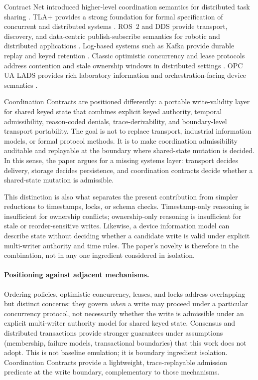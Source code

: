 \documentclass[11pt]{article}
\begin{document}
Contract Net introduced higher-level coordination semantics for distributed task sharing \cite{smith1980contract}. TLA$+$ provides a strong foundation for formal specification of concurrent and distributed systems \cite{lamport2002specifying}. ROS~2 and DDS provide transport, discovery, and data-centric publish-subscribe semantics for robotic and distributed applications \cite{ros2dds,ros2qos,ros2security}. Log-based systems such as Kafka provide durable replay and keyed retention \cite{kafkaIntro,kafkaCompact}. Classic optimistic concurrency and lease protocols address contention and stale ownership windows in distributed settings \cite{kung1981occ,gray1989leases}. OPC UA LADS provides rich laboratory information and orchestration-facing device semantics \cite{ladsScope,ladsIntro}.

Coordination Contracts are positioned differently: a portable write-validity layer for shared keyed state that combines explicit keyed authority, temporal admissibility, reason-coded denials, trace-derivability, and boundary-level transport portability. The goal is not to replace transport, industrial information models, or formal protocol methods. It is to make coordination admissibility auditable and replayable at the boundary where shared-state mutation is decided. In this sense, the paper argues for a missing systems layer: transport decides delivery, storage decides persistence, and coordination contracts decide whether a shared-state mutation is admissible.

This distinction is also what separates the present contribution from simpler reductions to timestamps, locks, or schema checks. Timestamp-only reasoning is insufficient for ownership conflicts; ownership-only reasoning is insufficient for stale or reorder-sensitive writes. Likewise, a device information model can describe state without deciding whether a candidate write is valid under explicit multi-writer authority and time rules. The paper's novelty is therefore in the combination, not in any one ingredient considered in isolation.

\paragraph{Positioning against adjacent mechanisms.}
Ordering policies, optimistic concurrency, leases, and locks address overlapping but distinct concerns: they govern \emph{when} a write may proceed under a particular concurrency protocol, not necessarily whether the write is admissible under an explicit multi-writer authority model for shared keyed state. Consensus and distributed transactions provide stronger guarantees under assumptions (membership, failure models, transactional boundaries) that this work does not adopt. This is not baseline emulation; it is boundary ingredient isolation. Coordination Contracts provide a lightweight, trace-replayable admission predicate at the write boundary, complementary to those mechanisms.
\end{document}
